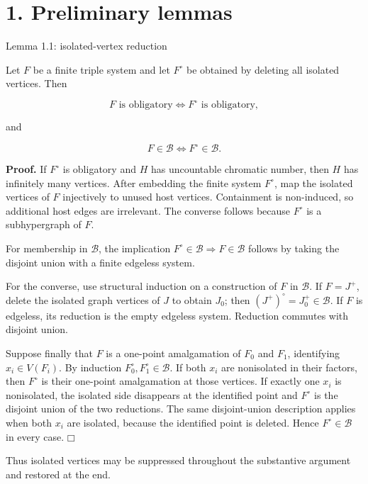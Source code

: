 \documentclass[11pt]{article}
\providecommand{\square}{\mdlgwhtsquare}
\begin{document}
\section{1. Preliminary lemmas}\label{preliminary-lemmas}

\label{lemma-1.1-isolated-vertex-reduction}
\begin{lemmabox}{Lemma 1.1: isolated-vertex reduction}

Let \(F\) be a finite triple system and let \(F^\circ\) be obtained by deleting all isolated vertices. Then

\[
F\text{ is obligatory}\iff F^\circ\text{ is obligatory},
\]

and

\[
F\in\mathcal B\iff F^\circ\in\mathcal B.
\]

\end{lemmabox}
\textbf{Proof.} If \(F^\circ\) is obligatory and \(H\) has uncountable chromatic number, then \(H\) has infinitely many vertices. After embedding the finite system \(F^\circ\), map the isolated vertices of \(F\) injectively to unused host vertices. Containment is non-induced, so additional host edges are irrelevant. The converse follows because \(F^\circ\) is a subhypergraph of \(F\).

For membership in \(\mathcal B\), the implication \(F^\circ\in\mathcal B\Rightarrow F\in\mathcal B\) follows by taking the disjoint union with a finite edgeless system.

For the converse, use structural induction on a construction of \(F\) in \(\mathcal B\). If \(F=J^+\), delete the isolated graph vertices of \(J\) to obtain \(J_0\); then \((J^+)^\circ=J_0^+\in\mathcal B\). If \(F\) is edgeless, its reduction is the empty edgeless system. Reduction commutes with disjoint union.

Suppose finally that \(F\) is a one-point amalgamation of \(F_0\) and \(F_1\), identifying \(x_i\in V(F_i)\). By induction \(F_0^\circ,F_1^\circ\in\mathcal B\). If both \(x_i\) are nonisolated in their factors, then \(F^\circ\) is their one-point amalgamation at those vertices. If exactly one \(x_i\) is nonisolated, the isolated side disappears at the identified point and \(F^\circ\) is the disjoint union of the two reductions. The same disjoint-union description applies when both \(x_i\) are isolated, because the identified point is deleted. Hence \(F^\circ\in\mathcal B\) in every case. \(\square\)

Thus isolated vertices may be suppressed throughout the substantive argument and restored at the end.
\end{document}

